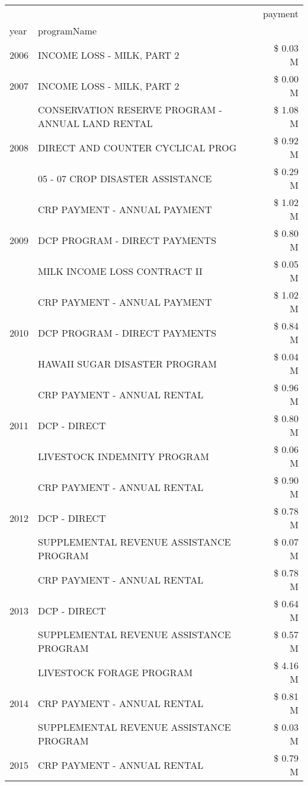 \begin{tabular}{llr}
\toprule
 &  & payment \\
year & programName &  \\
\midrule
2006 & INCOME LOSS - MILK, PART 2 & \$ 0.03 M \\
\cline{1-3}
2007 & INCOME LOSS - MILK, PART 2 & \$ 0.00 M \\
\cline{1-3}
\multirow[t]{3}{*}{2008} & CONSERVATION RESERVE PROGRAM - ANNUAL LAND RENTAL & \$ 1.08 M \\
 & DIRECT AND COUNTER CYCLICAL PROG & \$ 0.92 M \\
 & 05 - 07 CROP DISASTER ASSISTANCE & \$ 0.29 M \\
\cline{1-3}
\multirow[t]{3}{*}{2009} & CRP PAYMENT - ANNUAL PAYMENT & \$ 1.02 M \\
 & DCP PROGRAM - DIRECT PAYMENTS & \$ 0.80 M \\
 & MILK INCOME LOSS CONTRACT II & \$ 0.05 M \\
\cline{1-3}
\multirow[t]{3}{*}{2010} & CRP PAYMENT - ANNUAL PAYMENT & \$ 1.02 M \\
 & DCP PROGRAM - DIRECT PAYMENTS & \$ 0.84 M \\
 & HAWAII SUGAR DISASTER PROGRAM & \$ 0.04 M \\
\cline{1-3}
\multirow[t]{3}{*}{2011} & CRP PAYMENT - ANNUAL RENTAL & \$ 0.96 M \\
 & DCP - DIRECT & \$ 0.80 M \\
 & LIVESTOCK INDEMNITY PROGRAM & \$ 0.06 M \\
\cline{1-3}
\multirow[t]{3}{*}{2012} & CRP PAYMENT - ANNUAL RENTAL & \$ 0.90 M \\
 & DCP - DIRECT & \$ 0.78 M \\
 & SUPPLEMENTAL REVENUE ASSISTANCE PROGRAM & \$ 0.07 M \\
\cline{1-3}
\multirow[t]{3}{*}{2013} & CRP PAYMENT - ANNUAL RENTAL & \$ 0.78 M \\
 & DCP - DIRECT & \$ 0.64 M \\
 & SUPPLEMENTAL REVENUE ASSISTANCE PROGRAM & \$ 0.57 M \\
\cline{1-3}
\multirow[t]{3}{*}{2014} & LIVESTOCK FORAGE PROGRAM & \$ 4.16 M \\
 & CRP PAYMENT - ANNUAL RENTAL & \$ 0.81 M \\
 & SUPPLEMENTAL REVENUE ASSISTANCE PROGRAM & \$ 0.03 M \\
\cline{1-3}
\multirow[t]{3}{*}{2015} & CRP PAYMENT - ANNUAL RENTAL & \$ 0.79 M \\

\end{tabular}
